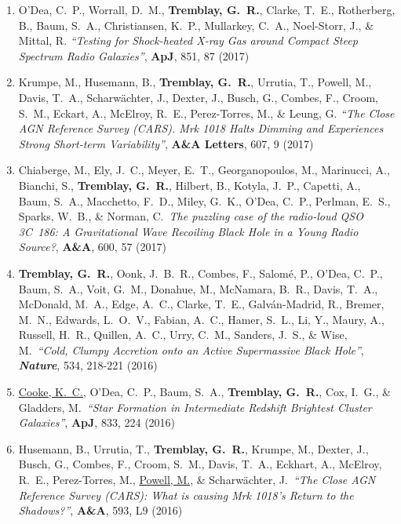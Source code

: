\documentclass[11pt]{article}
\begin{document}
\begin{enumerate}
\item O'Dea, C.~P., Worrall, D.~M., \textbf{Tremblay, G.~R.}, Clarke, T.~E., Rotherberg, B., Baum, S.~A.,
Christiansen, K.~P., Mullarkey, C.~A., Noel-Storr,
J., \& Mittal, R. \textit{``Testing for Shock-heated X-ray Gas around Compact Steep Spectrum Radio Galaxies''}, \textbf{ApJ}, 851, 87 (2017)


\item Krumpe, M., Husemann, B., \textbf{Tremblay, G.~R.}, Urrutia, T., Powell, M., Davis, T.~A., Scharw\"{a}chter, J., Dexter, J., Busch, G., Combes, F., Croom, S.~M.,
Eckart, A., McElroy, R.~E., Perez-Torres, M., \& Leung, G. \textit{``The Close AGN Reference Survey (CARS). Mrk 1018 Halts Dimming and Experiences Strong Short-term Variability''}, \textbf{A\&A Letters}, 607, 9 (2017)



\item Chiaberge, M., Ely, J.~C., Meyer, E.~T., Georganopoulos, M., Marinucci, A., Bianchi, S.,  \textbf{Tremblay, G.~R.}, Hilbert, B.,
Kotyla, J.~P., Capetti, A., Baum, S.~A.,  Macchetto, F.~D., Miley, G.~K.,
O'Dea, C.~P., Perlman, E.~S., Sparks, W.~B., \& Norman, C.\ \textit{The puzzling case of the radio-loud QSO 3C~186: A Gravitational Wave Recoiling Black Hole in a Young Radio Source?}, \textbf{A\&A}, 600, 57 (2017)


\item \textbf{Tremblay, G.~R.}, Oonk, J.~B.~R., Combes, F., Salom\'{e}, P., O'Dea, C.~P., Baum, S.~A., Voit, G.~M., Donahue, M., McNamara, B.~R., Davis, T.~A., McDonald, M.~A., Edge, A.~C., Clarke, T.~E., Galv\'{a}n-Madrid, R., Bremer, M.~N., Edwards, L.~O.~V., Fabian, A.~C.,  Hamer, S.~L., Li, Y., Maury, A., Russell, H.~R., Quillen, A.~C., Urry, C.~M., Sanders, J.~S., \& Wise, M.\ \textit{``Cold, Clumpy Accretion onto an Active Supermassive Black Hole''}, \textit{\textbf{Nature}},  534, 218-221 (2016)


\item \uline{Cooke, K.~C.}, O'Dea, C.~P., Baum, S.~A., \textbf{Tremblay, G.~R.}, Cox, I.~G., \& Gladders, M.\ \textit{``Star Formation in Intermediate Redshift Brightest Cluster Galaxies''}, \textbf{ApJ}, 833, 224 (2016)


\item Husemann, B., Urrutia, T., \textbf{Tremblay, G.~R.}, Krumpe, M., Dexter, J., Busch, G., Combes, F., Croom, S.~M., Davis, T.~A., Eckhart, A., McElroy, R.~E., Perez-Torres, M., \uline{Powell, M.}, \& Scharw\"{a}chter, J.\ \textit{``The Close AGN Reference Survey (CARS): What is causing Mrk 1018's Return to the Shadows?''}, \textbf{A\&A}, 593, L9 (2016)




\end{enumerate}
\end{document}
